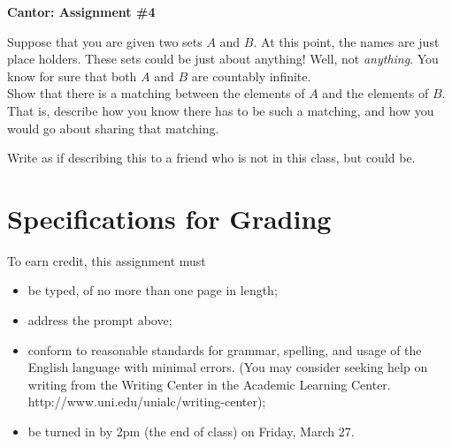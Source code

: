 \documentclass[12pt,letterpaper]{article}
\begin{document}
\setlength{\parskip}{1ex plus 0.5ex minus 0.2ex}
\setlength{\parindent}{0pt}

\pagestyle{fancy}
\lfoot{}
\rfoot{}

\begin{center}
{
\Large
\textbf{Cantor: Assignment \#4}
}
\end{center}

Suppose that you are given two sets $A$ and $B$.
At this point, the names are just place holders. 
These sets could be just about anything!
Well, not \emph{anything}.
You know for sure that both $A$ and $B$ are countably infinite.\\

Show that there is a matching between the elements of $A$ and the elements of $B$.
That is, describe how you know there has to be such a matching, and how you would go about sharing that matching.

Write as if describing this to a friend who is not in this class, but could be.

\section*{Specifications for Grading}

To earn credit, this assignment must
\begin{itemize}
\item be typed, of no more than one page in length;
\item address the prompt above;
\item conform to reasonable standards for grammar, spelling, and usage of the English language with minimal errors. (You may consider seeking help on writing from the Writing Center in the Academic Learning Center. http://www.uni.edu/unialc/writing-center);
\item be turned in by 2pm (the end of class) on Friday, March 27.
\end{itemize}
\end{document}
